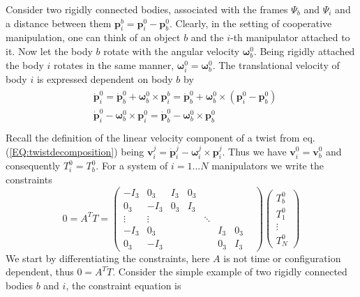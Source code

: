 \documentclass[a4paper,twoside, openright,12pt]{report}
\newcommand{\f}[1]{\boldsymbol{#1}}
\begin{document}
Consider two rigidly connected bodies, associated with the frames $\Psi_b$ and $\Psi_i$ and a distance between them $\f{p}_i^b = \f{p}_i^0 - \f{p}_b^0$. Clearly, in the setting of cooperative manipulation, one can think of an object $b$ and the $i$-th manipulator attached to it. Now let the body $b$ rotate with the angular velocity $\boldsymbol{\omega}_b^0$. Being rigidly attached the body $i$ rotates in the same manner, $\boldsymbol{\omega}_i^0 = \boldsymbol{\omega}_b^0$. The translational velocity of body $i$ is expressed dependent on body $b$ by 
\begin{eqnarray}
\begin{aligned}
&\dot{\f{p}}_i^0 = \dot{\f{p}}_b^0 + \boldsymbol{\omega}_b^0 \times \f{p}_i^b = \dot{\f{p}}_b^0 + \boldsymbol{\omega}_b^0 \times (\f{p}_i^0-\f{p}_b^0) \\
&\dot{\f{p}}_i^0 - \boldsymbol{\omega}_b^0 \times \f{p}_i^0 = \dot{\f{p}}_b^0 - \boldsymbol{\omega}_b^0 \times \f{p}_b^0 \\
\end{aligned}
\end{eqnarray}
Recall the definition of the linear velocity component of a twist from eq. (\ref{EQ:twistdecomposition}) being $\f{v}_i^j= \dot{\f{p}}_i^j - \boldsymbol{\omega}_i^j \times \f{p}_i^j$. Thus we have $\f{v}_i^0 = \f{v}_b^0$ and consequently $T_i^0 = T_b^0$. For a system of $i=1...N$ manipulators we write the constraints
\begin{equation}
0 = A^T T = \begin{pmatrix}
-I_3 & 0_3 & I_3 & 0_3 & & & \\
0_3 & -I_3 & 0_3 & I_3 & & & \\
\vdots & \vdots & & & \ddots & & & \\
- I_3 & 0_3 & & & & I_3 & 0_3 \\
0_3 & -I_3 & & & & 0_3 & I_3 
\end{pmatrix}
\begin{pmatrix}
T_b^0 \\ T_1^0 \\ \vdots \\ T_N^0
\end{pmatrix}
\end{equation}
We start by differentiating the constraints, here $A$ is not time or configuration dependent, thus $0=A^T\dot{T}$. Consider the simple example of two rigidly connected bodies $b$ and $i$, the constraint equation is
\end{document}
